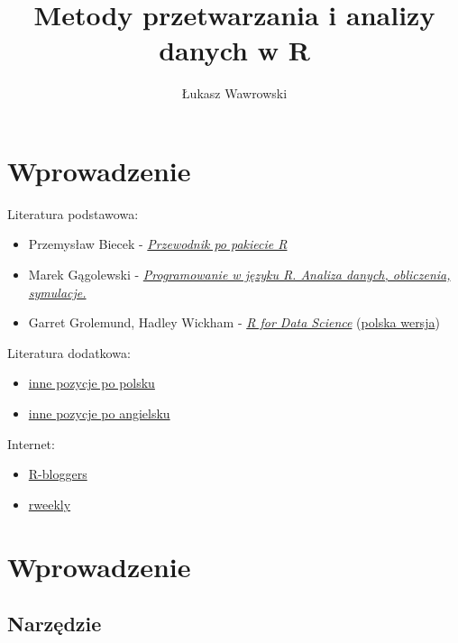 \documentclass[]{book}
\title{Metody przetwarzania i analizy danych w R}
\author{Łukasz Wawrowski}
\date{}
\providecommand{\tightlist}{%
  \setlength{\itemsep}{0pt}\setlength{\parskip}{0pt}}
\begin{document}
\maketitle

{
\setcounter{tocdepth}{1}
\tableofcontents
}
\hypertarget{wprowadzenie}{%
\chapter*{Wprowadzenie}\label{wprowadzenie}}

Literatura podstawowa:

\begin{itemize}
\tightlist
\item
  Przemysław Biecek - \href{http://pbiecek.github.io/Przewodnik/}{\emph{Przewodnik po pakiecie R}}
\item
  Marek Gągolewski - \href{http://www.gagolewski.com/publications/programowanier/}{\emph{Programowanie w języku R. Analiza danych, obliczenia, symulacje.}}
\item
  Garret Grolemund, Hadley Wickham - \href{http://r4ds.had.co.nz/}{\emph{R for Data Science}} (\href{https://helion.pl/ksiazki/jezyk-r-kompletny-zestaw-narzedzi-dla-analitykow-danych-hadley-wickham-garrett-grolemund,jezrko.htm}{polska wersja})
\end{itemize}

Literatura dodatkowa:

\begin{itemize}
\tightlist
\item
  \href{https://github.com/mi2-warsaw/SER/blob/master/histoRia/README.md}{inne pozycje po polsku}
\item
  \href{https://bookdown.org/}{inne pozycje po angielsku}
\end{itemize}

Internet:

\begin{itemize}
\tightlist
\item
  \href{https://www.r-bloggers.com/}{R-bloggers}
\item
  \href{https://rweekly.org/}{rweekly}
\end{itemize}

\hypertarget{wprowadzenie-1}{%
\chapter{Wprowadzenie}\label{wprowadzenie-1}}

\hypertarget{narzedzie}{%
\section{Narzędzie}\label{narzedzie}}
\end{document}
